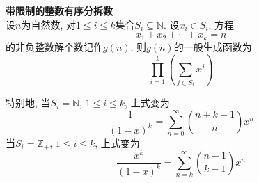 \begin{pro}
\textbf{带限制的整数有序分拆数}\\
设$n$为自然数, 对$1\le i\le k$集合$S_i\subseteq \mathbb{N}$. 设$x_i\in S_i$, 方程
\begin{equation}
    x_1+x_2+\cdots+x_k=n
\end{equation}
的非负整数解个数记作$g(n)$, 则$g(n)$的一般生成函数为
\begin{equation}
    \prod_{i=1}^k \left(\sum_{j\in S_i} x^j\right)
\end{equation}
\end{pro}

特别地, 当$S_i=\mathbb{N}$, $1\le i\le k$, 上式变为
\begin{equation}
    \frac{1}{(1-x)^k}=\sum_{n=0}^\infty \binom{n+k-1}{n} x^n
\end{equation}
当$S_i=\mathbb{Z}_+$, $1\le i\le k$, 上式变为
\begin{equation}
    \frac{x^k}{(1-x)^k}=\sum_{n=k}^\infty \binom{n-1}{k-1} x^n
\end{equation}

